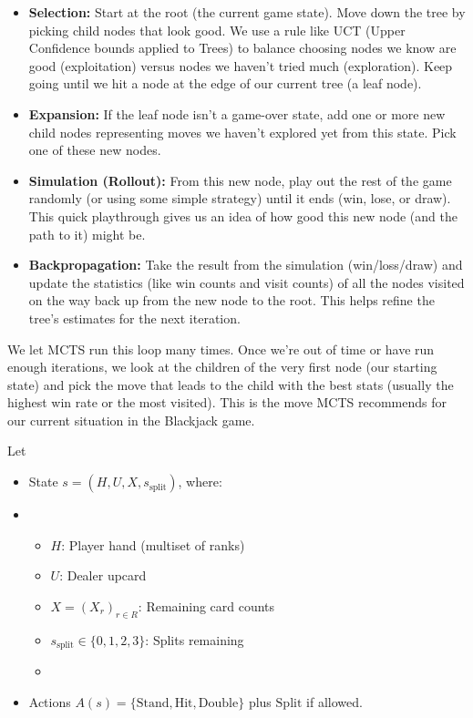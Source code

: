 \documentclass[12pt,a4paper]{cibb}
\begin{document}
\begin{itemize}
    \item \textbf{Selection:} Start at the root (the current game state). Move down the tree by picking child nodes that look good. We use a rule like UCT (Upper Confidence bounds applied to Trees) to balance choosing nodes we know are good (exploitation) versus nodes we haven't tried much (exploration). Keep going until we hit a node at the edge of our current tree (a leaf node).
    \item \textbf{Expansion:} If the leaf node isn't a game-over state, add one or more new child nodes representing moves we haven't explored yet from this state. Pick one of these new nodes.
    \item \textbf{Simulation (Rollout):} From this new node, play out the rest of the game randomly (or using some simple strategy) until it ends (win, lose, or draw). This quick playthrough gives us an idea of how good this new node (and the path to it) might be.
    \item \textbf{Backpropagation:} Take the result from the simulation (win/loss/draw) and update the statistics (like win counts and visit counts) of all the nodes visited on the way back up from the new node to the root. This helps refine the tree's estimates for the next iteration.
\end{itemize}

We let MCTS run this loop many times. Once we're out of time or have run enough iterations, we look at the children of the very first node (our starting state) and pick the move that leads to the child with the best stats (usually the highest win rate or the most visited). This is the move MCTS recommends for our current situation in the Blackjack game.

Let
\begin{itemize}
    \item State \(s=(H, U, X, s_{\mathrm{split}})\), where:
    \item \begin{itemize}[leftmargin=1.5cm]
\item \(H\): Player hand (multiset of ranks)
\item \(U\): Dealer up\-card
\item \(X=(X_r)_{r\in R}\): Remaining card counts
\item \(s_{\mathrm{split}}\in\{0,1,2,3\}\): Splits remaining
    \item \end{itemize}
    \item Actions \(A(s)=\{\mathrm{Stand},\mathrm{Hit},\mathrm{Double}\}\) plus \(\mathrm{Split}\) if allowed.
\end{itemize}
\end{document}
